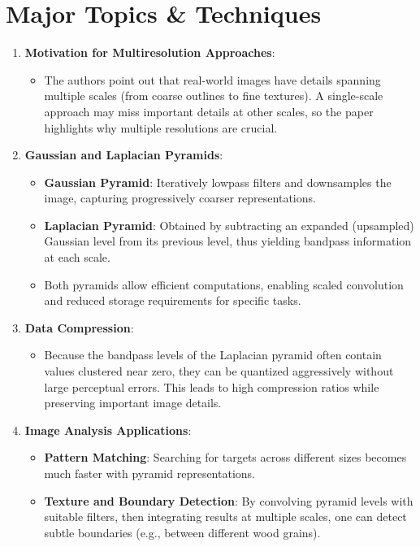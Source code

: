 \documentclass[12pt]{article}
\begin{document}
\section{Major Topics \& Techniques}
\begin{enumerate}[noitemsep]
    \item \textbf{Motivation for Multiresolution Approaches}:
    \begin{itemize}[noitemsep]
        \item The authors point out that real-world images have details spanning multiple scales (from coarse outlines to fine textures). A single-scale approach may miss important details at other scales, so the paper highlights why multiple resolutions are crucial.
    \end{itemize}
    \item \textbf{Gaussian and Laplacian Pyramids}:
    \begin{itemize}[noitemsep]
        \item \textbf{Gaussian Pyramid}: Iteratively lowpass filters and downsamples the image, capturing progressively coarser representations.
        \item \textbf{Laplacian Pyramid}: Obtained by subtracting an expanded (upsampled) Gaussian level from its previous level, thus yielding bandpass information at each scale.
        \item Both pyramids allow efficient computations, enabling scaled convolution and reduced storage requirements for specific tasks.
    \end{itemize}
    \item \textbf{Data Compression}:
    \begin{itemize}[noitemsep]
        \item Because the bandpass levels of the Laplacian pyramid often contain values clustered near zero, they can be quantized aggressively without large perceptual errors. This leads to high compression ratios while preserving important image details.
    \end{itemize}
    \item \textbf{Image Analysis Applications}:
    \begin{itemize}[noitemsep]
        \item \textbf{Pattern Matching}: Searching for targets across different sizes becomes much faster with pyramid representations.
        \item \textbf{Texture and Boundary Detection}: By convolving pyramid levels with suitable filters, then integrating results at multiple scales, one can detect subtle boundaries (e.g., between different wood grains).

\end{itemize}
\end{enumerate}
\end{document}
